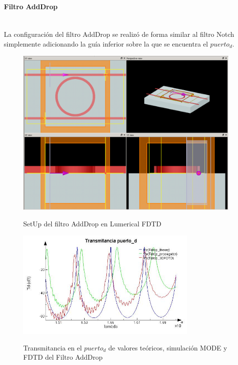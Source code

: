 \paragraph{Filtro AddDrop}~\\
La configuración del filtro AddDrop se realizó de forma similar al filtro Notch 
simplemente adicionando la guía inferior sobre la que se encuentra el $puerto_d$. 

\begin{figure}[H]
\caption{SetUp del filtro AddDrop en Lumerical FDTD}
\centering
\includegraphics[width=1.0\textwidth,natwidth=1074,natheight=808]{figs/lum_setup_ad.PNG}
\label{fig:lum_setup_ad}
\end{figure} 

\begin{figure}[H]
\caption{Transmitancia en el $puerto_d$ de valores teóricos, simulación MODE y 
FDTD del Filtro AddDrop}
\centering
\includegraphics[width=0.8\textwidth,natwidth=593,natheight=356]{figs/lum_Td.jpg}
\label{fig:lum_td_ad}
\end{figure} 

